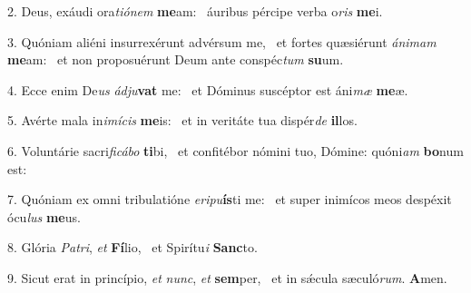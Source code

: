 2. Deus, exáudi ora\textit{ti}\textit{ó}\textit{nem} \textbf{me}am: \ast\  áuribus pércipe verba o\textit{ris} \textbf{me}i.\

3. Quóniam aliéni insurrexérunt advérsum me, \dag\  et fortes quæsiérunt \textit{á}\textit{ni}\textit{mam} \textbf{me}am: \ast\  et non proposuérunt Deum ante conspéc\textit{tum} \textbf{su}um.\

4. Ecce enim De\textit{us} \textit{ád}\textit{ju}\textbf{vat} me: \ast\  et Dóminus suscéptor est áni\textit{mæ} \textbf{me}æ.\

5. Avérte mala in\textit{i}\textit{mí}\textit{cis} \textbf{me}is: \ast\  et in veritáte tua dispér\textit{de} \textbf{il}los.\

6. Voluntárie sacri\textit{fi}\textit{cá}\textit{bo} \textbf{ti}bi, \ast\  et confitébor nómini tuo, Dómine: quóni\textit{am} \textbf{bo}num est:\

7. Quóniam ex omni tribulatióne \textit{e}\textit{ri}\textit{pu}\textbf{ís}ti me: \ast\  et super inimícos meos despéxit ócu\textit{lus} \textbf{me}us.\

8. Glória \textit{Pa}\textit{tri}, \textit{et} \textbf{Fí}lio, \ast\  et Spirítu\textit{i} \textbf{Sanc}to.\

9. Sicut erat in princípio, \textit{et} \textit{nunc}, \textit{et} \textbf{sem}per, \ast\  et in sǽcula sæculó\textit{rum}. \textbf{A}men.\

